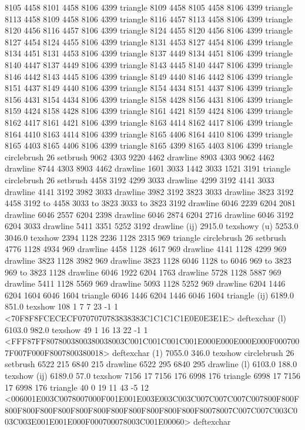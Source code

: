 8105 4458 8101 4458 8106 4399 triangle
8109 4458 8105 4458 8106 4399 triangle
8113 4458 8109 4458 8106 4399 triangle
8116 4457 8113 4458 8106 4399 triangle
8120 4456 8116 4457 8106 4399 triangle
8124 4455 8120 4456 8106 4399 triangle
8127 4454 8124 4455 8106 4399 triangle
8131 4453 8127 4454 8106 4399 triangle
8134 4451 8131 4453 8106 4399 triangle
8137 4449 8134 4451 8106 4399 triangle
8140 4447 8137 4449 8106 4399 triangle
8143 4445 8140 4447 8106 4399 triangle
8146 4442 8143 4445 8106 4399 triangle
8149 4440 8146 4442 8106 4399 triangle
8151 4437 8149 4440 8106 4399 triangle
8154 4434 8151 4437 8106 4399 triangle
8156 4431 8154 4434 8106 4399 triangle
8158 4428 8156 4431 8106 4399 triangle
8159 4424 8158 4428 8106 4399 triangle
8161 4421 8159 4424 8106 4399 triangle
8162 4417 8161 4421 8106 4399 triangle
8163 4414 8162 4417 8106 4399 triangle
8164 4410 8163 4414 8106 4399 triangle
8165 4406 8164 4410 8106 4399 triangle
8165 4403 8165 4406 8106 4399 triangle
8165 4399 8165 4403 8106 4399 triangle
circlebrush 26 setbrush
9062 4303 9220 4462 drawline
8903 4303 9062 4462 drawline
8744 4303 8903 4462 drawline
1601 3033 1442 3033 1521 3191 triangle
circlebrush 26 setbrush
4458 3192 4299 3033 drawline
4299 3192 4141 3033 drawline
4141 3192 3982 3033 drawline
3982 3192 3823 3033 drawline
3823 3192 4458 3192 to 4458 3033 to 3823 3033 to 3823 3192 drawline
6046 2239 6204 2081 drawline
6046 2557 6204 2398 drawline
6046 2874 6204 2716 drawline
6046 3192 6204 3033 drawline
5411 3351 5252 3192 drawline
(ij) 2915.0 texshowy
(u) 5253.0 3046.0 texshow
2394 1128 2236 1128 2315 969 triangle
circlebrush 26 setbrush
4776 1128 4934 969 drawline
4458 1128 4617 969 drawline
4141 1128 4299 969 drawline
3823 1128 3982 969 drawline
3823 1128 6046 1128 to 6046 969 to 3823 969 to 3823 1128 drawline
6046 1922 6204 1763 drawline
5728 1128 5887 969 drawline
5411 1128 5569 969 drawline
5093 1128 5252 969 drawline
6204 1446 6204 1604 6046 1604 triangle
6046 1446 6204 1446 6046 1604 triangle
(ij) 6189.0 851.0 texshow
108 1 7 7 23 -1 1 {{<70F8F8FCECECF0707070783838383C1C1C1C1E0E0E3E1E>}} deftexchar
(l) 6103.0 982.0 texshow
49 1 16 13 22 -1 1 {{<FFF87FF8078003800380038003C001C001C001C001E000E000E000E000F0007007F007F000F8007800380018>}} deftexchar
(1) 7055.0 346.0 texshow
circlebrush 26 setbrush
6522 215 6840 215 drawline
6522 295 6840 295 drawline
(l) 6103.0 188.0 texshow
(ij) 6189.0 57.0 texshow
7156 17 7156 176 6998 176 triangle
6998 17 7156 17 6998 176 triangle
40 0 19 11 43 -5 12 {{<006001E003C0078007000F001E001E003E003C003C007C007C007C007800F800F800F800F800F800F800F800F800F800F800F800F800F80078007C007C007C003C003C003E001E001E000F000700078003C001E00060>}} deftexchar
